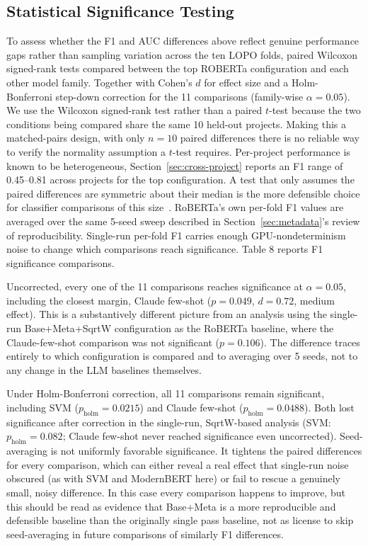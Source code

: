\documentclass[preprint,12pt]{elsarticle}
\begin{document}
\subsection{Statistical Significance Testing}
\label{sec:significance}

To assess whether the F1 and AUC differences above reflect genuine performance gaps rather than sampling variation across the ten LOPO folds, paired Wilcoxon signed-rank tests compared between the top ROBERTa configuration and each other model family. Together with Cohen's $d$ for effect size and a Holm-Bonferroni step-down correction for the 11 comparisons (family-wise $\alpha=0.05$). We use the Wilcoxon signed-rank test rather than a paired $t$-test because the two conditions being compared share the same 10 held-out projects. Making this a matched-pairs design, with only $n=10$ paired differences there is no reliable way to verify the normality assumption a $t$-test requires. Per-project performance is known to be heterogeneous, Section~\ref{sec:cross-project} reports an F1 range of 0.45--0.81 across projects for the top configuration. A test that only assumes the paired differences are symmetric about their median is the more defensible choice for classifier comparisons of this size~\cite{carrasco2020statistical}. RoBERTa's own per-fold F1 values are averaged over the same 5-seed sweep described in Section~\ref{sec:metadata}'s review of reproducibility. Single-run per-fold F1 carries enough GPU-nondeterminism noise to change which comparisons reach significance. Table 8 reports F1 significance comparisons.

Uncorrected, every one of the 11 comparisons reaches significance at $\alpha=0.05$, including the closest margin, Claude few-shot ($p=0.049$, $d=0.72$, medium effect). This is a substantively different picture from an analysis using the single-run Base+Meta+SqrtW configuration as the RoBERTa baseline, where the Claude-few-shot comparison was not significant ($p=0.106$). The difference traces entirely to which configuration is compared and to averaging over 5 seeds, not to any change in the LLM baselines themselves.

Under Holm-Bonferroni correction, all 11 comparisons remain significant, including SVM ($p_{\text{holm}}=0.0215$) and Claude few-shot ($p_{\text{holm}}=0.0488$). Both lost significance after correction in the single-run, SqrtW-based analysis (SVM: $p_{\text{holm}}=0.082$; Claude few-shot never reached significance even uncorrected). Seed-averaging is not uniformly favorable significance. It tightens the paired differences for every comparison, which can either reveal a real effect that single-run noise obscured (as with SVM and ModernBERT here) or fail to rescue a genuinely small, noisy difference. In this case every comparison happens to improve, but this should be read as evidence that Base+Meta is a more reproducible and defensible baseline than the originally single pass baseline, not as license to skip seed-averaging in future comparisons of similarly F1 differences.
\end{document}
